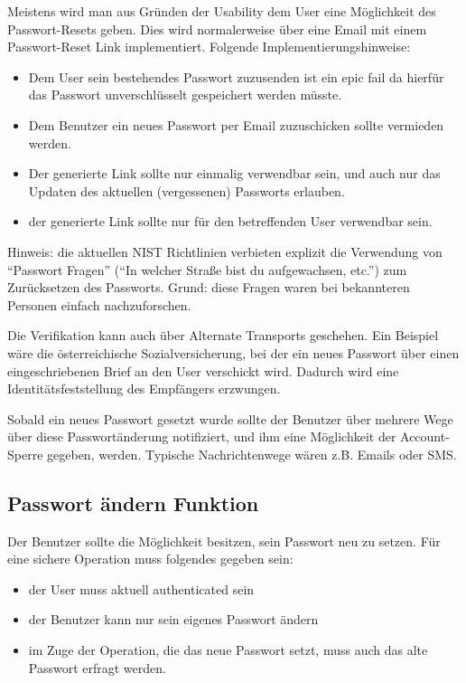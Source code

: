 Meistens wird man aus Gründen der Usability dem User eine Möglichkeit des Passwort-Resets geben. Dies wird normalerweise über eine Email mit einem Passwort-Reset Link implementiert. Folgende Implementierungshinweise:

\begin{itemize}
	\item Dem User sein bestehendes Passwort zuzusenden ist ein epic fail da hierfür das Passwort unverschlüsselt gespeichert werden müsste.
	\item Dem Benutzer ein neues Passwort per Email zuzuschicken sollte vermieden werden.
	\item Der generierte Link sollte nur einmalig verwendbar sein, und auch nur das Updaten des aktuellen (vergessenen) Passworts erlauben.
	\item der generierte Link sollte nur für den betreffenden User verwendbar sein.
\end{itemize}

Hinweis: die aktuellen NIST Richtlinien verbieten explizit die Verwendung von ``Passwort Fragen'' (``In welcher Straße bist du aufgewachsen, etc.'') zum Zurücksetzen des Passworts. Grund: diese Fragen waren bei bekannteren Personen einfach nachzuforschen.

Die Verifikation kann auch über Alternate Transports geschehen. Ein Beispiel wäre die österreichische Sozialversicherung, bei der ein neues Passwort über einen eingeschriebenen Brief an den User verschickt wird. Dadurch wird eine Identitätsfeststellung des Empfängers erzwungen.

Sobald ein neues Passwort gesetzt wurde sollte der Benutzer über mehrere Wege über diese Passwortänderung notifiziert, und ihm eine Möglichkeit der Account-Sperre gegeben, werden. Typische Nachrichtenwege wären z.B. Emails oder SMS.

\subsection{Passwort ändern Funktion}

Der Benutzer sollte die Möglichkeit besitzen, sein Passwort neu zu setzen. Für eine sichere Operation muss folgendes gegeben sein:

\begin{itemize}
	\item der User muss aktuell authenticated sein
	\item der Benutzer kann nur sein eigenes Passwort ändern
	\item im Zuge der Operation, die das neue Passwort setzt, muss auch das alte Passwort erfragt werden.
\end{itemize}

